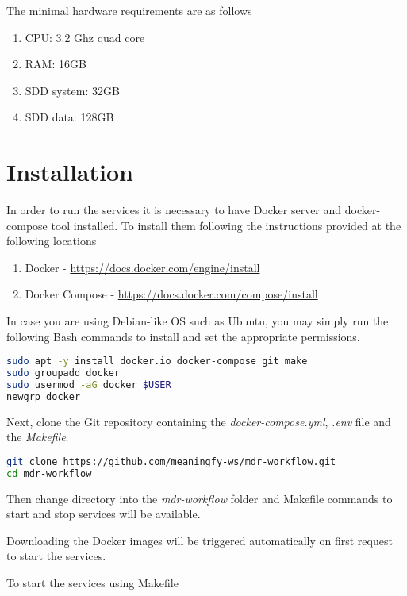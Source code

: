 	The minimal hardware requirements are as follows 
	\begin{enumerate}
		\item CPU: 3.2 Ghz quad core 
		\item RAM: 16GB 
		\item SDD system: 32GB 
		\item SDD data: 128GB 
	\end{enumerate}	

\section{Installation}
\label{sec:installation}

	In order to run the services it is necessary to have Docker server and docker-compose tool installed. To install them following the instructions provided at the following locations
	
	\begin{enumerate}
		\item Docker - \url{https://docs.docker.com/engine/install}
		\item Docker Compose - \url{https://docs.docker.com/compose/install}
	\end{enumerate}
	
	In case you are using Debian-like OS such as Ubuntu, you may simply run the following Bash commands to install and set the appropriate permissions. 
	
	\begin{lstlisting}[language=bash,]
sudo apt -y install docker.io docker-compose git make
sudo groupadd docker
sudo usermod -aG docker $USER
newgrp docker
	\end{lstlisting}
	
	Next, clone the Git repository containing the \textit{docker-compose.yml}, \textit{.env} file and the \textit{Makefile}.
	
\begin{lstlisting}[language=bash,]
git clone https://github.com/meaningfy-ws/mdr-workflow.git
cd mdr-workflow
\end{lstlisting}	
	
	Then change directory into the \textit{mdr-workflow} folder and Makefile commands to start and stop services will be available. 	
	
	Downloading the Docker images will be triggered automatically on first request to start the services. 
	
	To start the services using Makefile

